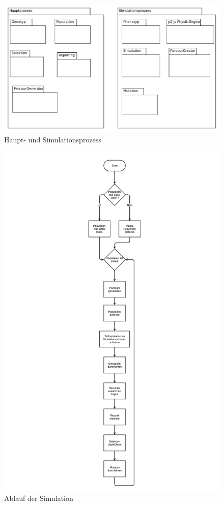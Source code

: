     \begin{figure}[H]
      \includegraphics[width=\textwidth,center]{graphics/process-organization}
      \caption{Haupt- und Simulationsprozess\label{fig:hauptSimuProzesse}}
    \end{figure}
    \begin{figure}[H]
      \includegraphics[width=\textwidth,center]{graphics/uml/flow-simulation}
      \caption{Ablauf der Simulation\label{fig:ablauf}}
    \end{figure}

